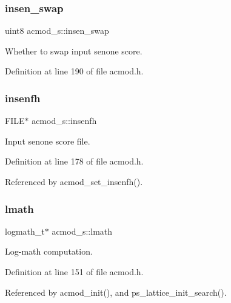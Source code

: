 \mbox{\label{structacmod__s_ae6ed7e1e5b4bec021a0ba17c0ac02bd7}} 
\subsubsection{insen\+\_\+swap}
{\footnotesize\ttfamily uint8 acmod\+\_\+s\+::insen\+\_\+swap}



Whether to swap input senone score. 



Definition at line 190 of file acmod.\+h.

\mbox{\label{structacmod__s_ad0998a9d887db82bd684e9454c9b044e}} 
\subsubsection{insenfh}
{\footnotesize\ttfamily F\+I\+LE$\ast$ acmod\+\_\+s\+::insenfh}



Input senone score file. 



Definition at line 178 of file acmod.\+h.



Referenced by acmod\+\_\+set\+\_\+insenfh().

\mbox{\label{structacmod__s_a9de7e8ac9c0c4df3d2a9ad5406787f3c}} 
\subsubsection{lmath}
{\footnotesize\ttfamily logmath\+\_\+t$\ast$ acmod\+\_\+s\+::lmath}



Log-\/math computation. 



Definition at line 151 of file acmod.\+h.



Referenced by acmod\+\_\+init(), and ps\+\_\+lattice\+\_\+init\+\_\+search().

\mbox{\label{structacmod__s_a95d5195647b6395d95433d45e3f74d51}} 
